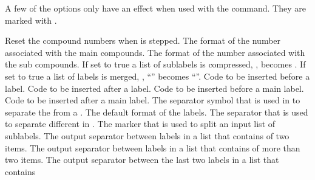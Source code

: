 \documentclass[load-preamble+,ngerman,british,american]{cnltx-doc}
\begin{document}
A few of the options only have an effect when used with the 
command.  They are marked with .

\begin{options}
    Reset the compound numbers when  is stepped.
    The format of the number associated with the main compounds.
    The format of the number associated with the sub compounds.
    If set to true a list of sublabels is compressed, \ie,
     becomes
    .
    If set to true a list of labels is merged, \ie,
    ``'' becomes ``''.
  \Default
    Code to be inserted before a label.
  \Default
    Code to be inserted after a label.
  \Default
    Code to be inserted before a main label.
  \Default
    Code to be inserted after a main label.
    The separator symbol that is used in  to separate the  from a .
    The default format of the labels.
  \Default{,}
    The separator that is used to separate different  in
    .
  \Default{,}
    The marker that is used to split an input list of sublabels.
    The output separator between labels in a list that contains of two items.
  \Default{\visualizespaces{, }}
    The output separator between labels in a list that contains of more than
    two items.
    The output separator between the last two labels in a list that contains

\end{options}
\end{document}
